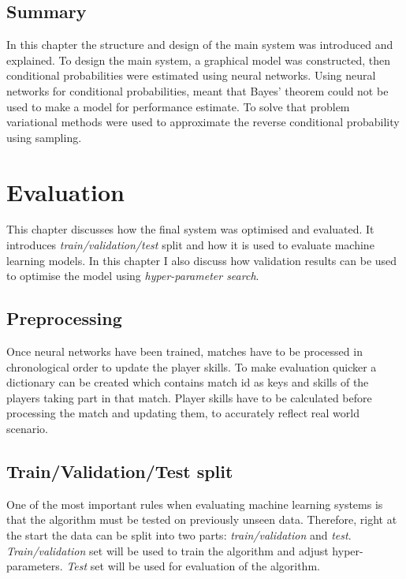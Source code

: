 \documentclass[12pt,a4paper]{book}
\begin{document}
\section{Summary}
In this chapter the structure and design of the main system was introduced and explained.
To design the main system, a graphical model was constructed, then conditional probabilities were estimated using neural networks.
Using neural networks for conditional probabilities, meant that Bayes' theorem could not be used to make a model for performance estimate.
To solve that problem variational methods were used to approximate the reverse conditional probability using sampling.

\chapter{Evaluation}
This chapter discusses how the final system was optimised and evaluated.
It introduces \emph{train/validation/test} split and how it is used to evaluate machine learning models.
In this chapter I also discuss how validation results can be used to optimise the model using \emph{hyper-parameter search}.

\section{Preprocessing}
Once neural networks have been trained, matches have to be processed in chronological order to update the player skills.
To make evaluation quicker a dictionary can be created which contains match id as keys and skills of the players taking part in that match.
Player skills have to be calculated before processing the match and updating them, to accurately reflect real world scenario.
\section{Train/Validation/Test split}
One of the most important rules when evaluating machine learning systems is that the algorithm must be tested on previously unseen data.
Therefore, right at the start the data can be split into two parts: \emph{train/validation} and \emph{test}.
\emph{Train/validation} set will be used to train the algorithm and adjust hyper-parameters.
\emph{Test} set will be used for evaluation of the algorithm.
\end{document}
